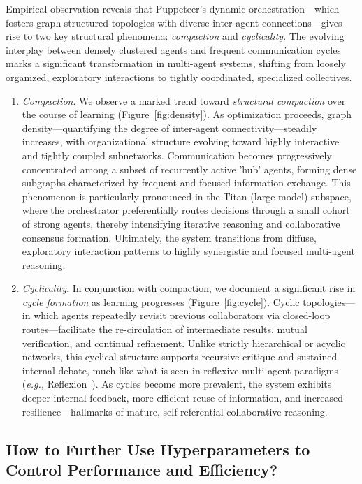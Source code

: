 \documentclass{article}
\newcommand{\eg}{\textit{e.g., }}
\begin{document}
Empirical observation reveals that Puppeteer’s dynamic orchestration—which fosters graph-structured topologies with diverse inter-agent connections—gives rise to two key structural phenomena: \emph{compaction} and \emph{cyclicality}. The evolving interplay between densely clustered agents and frequent communication cycles marks a significant transformation in multi-agent systems, shifting from loosely organized, exploratory interactions to tightly coordinated, specialized collectives. 
\begin{enumerate}[$\bullet$]
\setlength{\topsep}{0pt}
\setlength{\itemsep}{0pt}
\item \emph{Compaction}. We observe a marked trend toward \emph{structural compaction} over the course of learning (Figure~\ref{fig:density}). As optimization proceeds, graph density---quantifying the degree of inter-agent connectivity---steadily increases, with organizational structure evolving toward highly interactive and tightly coupled subnetworks. Communication becomes progressively concentrated among a subset of recurrently active 'hub' agents, forming dense subgraphs characterized by frequent and focused information exchange. This phenomenon is particularly pronounced in the Titan (large-model) subspace, where the orchestrator preferentially routes decisions through a small cohort of strong agents, thereby intensifying iterative reasoning and collaborative consensus formation. Ultimately, the system transitions from diffuse, exploratory interaction patterns to highly synergistic and focused multi-agent reasoning.
\item \emph{Cyclicality}. In conjunction with compaction, we document a significant rise in \emph{cycle formation} as learning progresses (Figure~\ref{fig:cycle}). Cyclic topologies---in which agents repeatedly revisit previous collaborators via closed-loop routes---facilitate the re-circulation of intermediate results, mutual verification, and continual refinement. Unlike strictly hierarchical or acyclic networks, this cyclical structure supports recursive critique and sustained internal debate, much like what is seen in reflexive multi-agent paradigms (\eg Reflexion~\cite{shinn2023reflexion}). As cycles become more prevalent, the system exhibits deeper internal feedback, more efficient reuse of information, and increased resilience---hallmarks of mature, self-referential collaborative reasoning.
\end{enumerate}

\subsection{How to Further Use Hyperparameters to Control Performance and Efficiency?}
\end{document}
